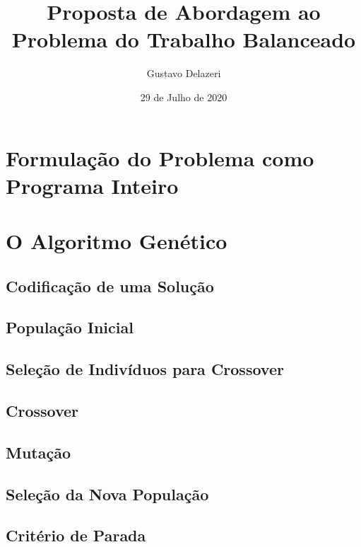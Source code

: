 \documentclass{article}
\title{Proposta de Abordagem ao Problema do Trabalho Balanceado}
\author{Gustavo Delazeri}
\date{29 de Julho de 2020}
\begin{document}
\maketitle

\section{Formulação do Problema como Programa Inteiro}

\section{O Algoritmo Genético}
\subsection{Codificação de uma Solução}
\subsection{População Inicial}
\subsection{Seleção de Indivíduos para Crossover}
\subsection{Crossover}
\subsection{Mutação}
\subsection{Seleção da Nova População}
\subsection{Critério de Parada}
\end{document}
